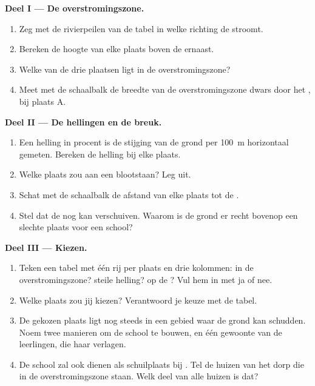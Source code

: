 \begin{problem}
\noindent\textbf{Deel I --- De overstromingszone.}\par\nopagebreak
\begin{enumerate}[beginpenalty=10000]
  \item Zeg met de rivierpeilen van de tabel in welke richting de 
        stroomt.
  \item Bereken de hoogte van elke plaats boven de  ernaast.
  \item Welke van de drie plaatsen ligt in de overstromingszone?
  \item Meet met de schaalbalk de breedte van de overstromingszone dwars
        door het , bij plaats A.
\end{enumerate}

\noindent\textbf{Deel II --- De hellingen en de breuk.}\par\nopagebreak
\begin{enumerate}[resume, beginpenalty=10000]
  \item Een helling in procent is de stijging van de grond per
        \qty{100}{m} horizontaal gemeten. Bereken de helling bij elke
        plaats.
  \item Welke plaats zou aan een  blootstaan? Leg uit.
  \item Schat met de schaalbalk de afstand van elke plaats tot de .
  \item Stel dat de  nog kan verschuiven. Waarom is de grond er recht
        bovenop een slechte plaats voor een school?
\end{enumerate}

\noindent\textbf{Deel III --- Kiezen.}\par\nopagebreak
\begin{enumerate}[resume, beginpenalty=10000]
  \item Teken een tabel met één rij per plaats en drie kolommen: in de
        overstromingszone? steile helling? op de ? Vul hem in met ja
        of nee.
  \item Welke plaats zou jij kiezen? Verantwoord je keuze met de tabel.
  \item De gekozen plaats ligt nog steeds in een gebied waar de grond kan
        schudden. Noem twee manieren om de school te bouwen, en één
        gewoonte van de leerlingen, die haar  verlagen.
  \item De school zal ook dienen als schuilplaats bij . Tel
        de huizen van het dorp die in de overstromingszone staan. Welk deel
        van alle huizen is dat?
\end{enumerate}
\end{problem}
